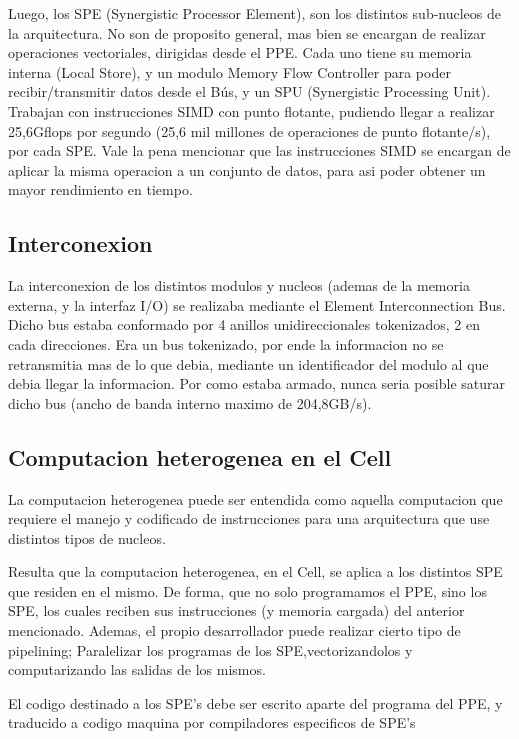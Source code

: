 \documentclass[11pt,compsoc]{IEEEtran}
\begin{document}
	Luego, los SPE (Synergistic Processor Element), son los distintos sub-nucleos de la arquitectura. No son de proposito general, mas bien se encargan de realizar operaciones vectoriales, dirigidas desde el PPE. Cada uno tiene su memoria interna (Local Store), y un modulo Memory Flow Controller para poder recibir/transmitir datos desde el Bús, y un SPU (Synergistic Processing Unit).
	Trabajan con instrucciones SIMD con punto flotante, pudiendo llegar a realizar 25,6Gflops por segundo (25,6 mil millones de operaciones de punto flotante/s), por cada SPE. Vale la pena mencionar que las instrucciones SIMD se encargan de aplicar la misma operacion a un conjunto de datos, para asi poder obtener un mayor rendimiento en tiempo.\newline
	
	\subsection{Interconexion} 
	\noindent La interconexion de los distintos modulos y nucleos (ademas de la memoria externa, y la interfaz I/O) se realizaba mediante el Element Interconnection Bus. Dicho bus estaba conformado por 4 anillos unidireccionales tokenizados, 2 en cada direcciones. Era un bus tokenizado, por ende la informacion no se retransmitia mas de lo que debia, mediante un identificador del modulo al que debia llegar la informacion. 
	Por como estaba armado, nunca seria posible saturar dicho bus (ancho de banda interno maximo de 204,8GB/s).
	
	\subsection{Computacion heterogenea en el Cell }%
	\noindent La computacion heterogenea puede ser entendida como aquella computacion que requiere el manejo y codificado de instrucciones para una arquitectura que use distintos tipos de nucleos.\newline
	
	 Resulta que la computacion heterogenea, en el Cell, se aplica a los distintos SPE que residen en el mismo. De forma, que no solo programamos el PPE, sino los SPE, los cuales reciben sus instrucciones (y memoria cargada) del anterior mencionado. Ademas, el propio desarrollador puede realizar cierto tipo de pipelining; Paralelizar los programas de los SPE,vectorizandolos y computarizando las salidas de los mismos.\newline
	 
	 El codigo destinado a los SPE's debe ser escrito aparte del programa del PPE, y traducido a codigo maquina por compiladores especificos de SPE's
	
\end{document}
